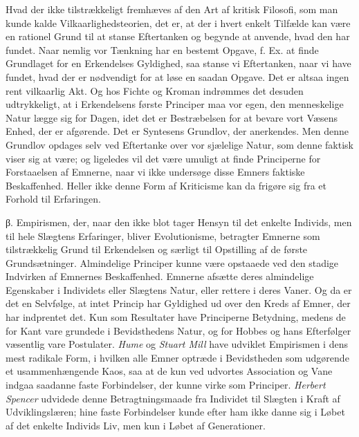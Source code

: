 \documentclass[12pt,a4paper]{book}
\newcommand{\apage}[1]{\marginnote{\footnotesize\textit{[#1]}}}
\begin{document}
Hvad der ikke tilstrækkeligt fremhæves af den Art af kritisk Filosofi, som man
kunde kalde Vilkaarlighedsteorien, det er, at der i hvert enkelt Tilfælde kan være
en rationel Grund til at stanse Eftertanken og begynde at anvende, hvad den har
fundet. Naar nemlig vor Tænkning har en bestemt Opgave, f. Ex. at finde Grundlaget
for en Erkendelses Gyldighed, saa stanse vi Eftertanken, naar vi have fundet, hvad
der er nødvendigt for at løse en saadan Opgave. Det er altsaa ingen rent vilkaarlig
Akt. Og hos Fichte og Kroman indrømmes det desuden udtrykkeligt, at i Erkendelsens
første Principer maa vor egen, den menneskelige Natur lægge sig for Dagen, idet det
er Bestræbelsen for at bevare vort Væsens Enhed, der er afgørende. Det er Syntesens
Grundlov, der anerkendes. Men denne Grundlov opdages selv ved Eftertanke over vor
sjælelige Natur, som denne faktisk viser sig at være; og ligeledes vil det være
umuligt at finde Principerne for Forstaaelsen af Emnerne, naar vi ikke undersøge
disse Emners \apage{269} faktiske Beskaffenhed. Heller ikke denne Form af Kriticisme kan da
frigøre sig fra et Forhold til Erfaringen.

β. Empirismen, der, naar den ikke blot tager Hensyn til det enkelte Individs, men
til hele Slægtens Erfaringer, bliver Evolutionisme, betragter Emnerne som
tilstrækkelig Grund til Erkendelsen og særligt til Opstilling af de første
Grundsætninger. Almindelige Principer kunne være opstaaede ved den stadige Indvirken
af Emnernes Beskaffenhed. Emnerne afsætte deres almindelige Egenskaber i Individets
eller Slægtens Natur, eller rettere i deres Vaner. Og da er det en Selvfølge, at
intet Princip har Gyldighed ud over den Kreds af Emner, der har indprentet det. Kun
som Resultater have Principerne Betydning, medens de for Kant vare grundede i
Bevidsthedens Natur, og for Hobbes og hans Efterfølger væsentlig vare Postulater.
\emph{Hume} og \emph{Stuart Mill} have udviklet Empirismen i dens mest radikale
Form, i hvilken alle Emner optræde i Bevidstheden som udgørende et usammenhængende
Kaos, saa at de kun ved udvortes Association og Vane indgaa saadanne faste
Forbindelser, der kunne virke som Principer. \emph{Herbert Spencer} udvidede denne
Betragtningsmaade fra Individet til Slægten i Kraft af Udviklingslæren; hine faste
Forbindelser kunde efter ham ikke danne sig i Løbet af det enkelte Individs Liv, men
kun i Løbet af Generationer.
\end{document}

